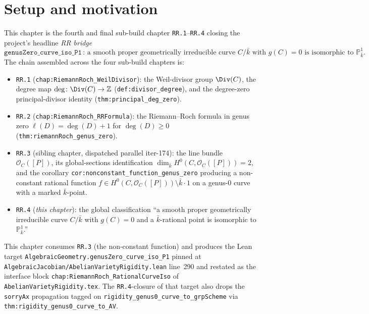 \section{Setup and motivation}
This chapter is the fourth and final sub-build chapter
\texttt{RR.1}--\texttt{RR.4} closing the project's headline \emph{RR bridge}
\[
  \mathtt{genusZero\_curve\_iso\_P1}
  \,\colon\,
  \text{a smooth proper geometrically irreducible curve \(C / \bar k\) with
  \(g(C) = 0\) is isomorphic to \(\mathbb P^1_{\bar k}\).}
\]
The chain assembled across the four sub-build chapters is:
\begin{itemize}
  \item \texttt{RR.1} (\texttt{chap:RiemannRoch_WeilDivisor}): the Weil-divisor
    group \(\Div(C)\), the degree map
    \(\deg \colon \Div(C) \to \mathbb Z\) (\texttt{def:divisor_degree}), and the
    degree-zero principal-divisor identity
    (\texttt{thm:principal_deg_zero}).
  \item \texttt{RR.2} (\texttt{chap:RiemannRoch_RRFormula}): the Riemann--Roch
    formula in genus zero \(\ell(D) = \deg(D) + 1\) for \(\deg(D) \geq 0\)
    (\texttt{thm:riemannRoch_genus_zero}).
  \item \texttt{RR.3} (sibling chapter, dispatched parallel iter-174):
    the line bundle \(\mathcal O_C([P])\), its global-sections identification
    \(\dim_{\bar k} H^0(C, \mathcal O_C([P])) = 2\), and the corollary
    \texttt{cor:nonconstant\_function\_genus\_zero} producing a non-constant
    rational function $f \in H^0(C, \mathcal O_C([P])) \setminus
    \bar k \cdot 1$ on a genus-$0$ curve with a marked $\bar k$-point.
  \item \texttt{RR.4} (\emph{this chapter}): the global classification ``a
    smooth proper geometrically irreducible curve \(C / \bar k\) with \(g(C) = 0\)
    and a \(\bar k\)-rational point is isomorphic to \(\mathbb P^1_{\bar k}\).''
\end{itemize}
This chapter consumes \texttt{RR.3} (the non-constant function) and produces
the Lean target \texttt{AlgebraicGeometry.genusZero\_curve\_iso\_P1} pinned at
\texttt{AlgebraicJacobian/AbelianVarietyRigidity.lean} line~290 and restated as
the interface block \texttt{chap:RiemannRoch_RationalCurveIso} of
\texttt{AbelianVarietyRigidity.tex}. The \texttt{RR.4}-closure of that target
also drops the \texttt{sorryAx} propagation tagged on
\texttt{rigidity\_genus0\_curve\_to\_grpScheme} via
\texttt{thm:rigidity_genus0_curve_to_AV}.
